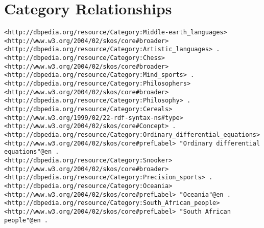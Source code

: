 \section{Category Relationships}
\begin{lstlisting}[breaklines, basicstyle=\small]
<http://dbpedia.org/resource/Category:Middle-earth_languages> <http://www.w3.org/2004/02/skos/core#broader> <http://dbpedia.org/resource/Category:Artistic_languages> .
<http://dbpedia.org/resource/Category:Chess> <http://www.w3.org/2004/02/skos/core#broader> <http://dbpedia.org/resource/Category:Mind_sports> .
<http://dbpedia.org/resource/Category:Philosophers> <http://www.w3.org/2004/02/skos/core#broader> <http://dbpedia.org/resource/Category:Philosophy> .
<http://dbpedia.org/resource/Category:Cereals> <http://www.w3.org/1999/02/22-rdf-syntax-ns#type> <http://www.w3.org/2004/02/skos/core#Concept> .
<http://dbpedia.org/resource/Category:Ordinary_differential_equations> <http://www.w3.org/2004/02/skos/core#prefLabel> "Ordinary differential equations"@en .
<http://dbpedia.org/resource/Category:Snooker> <http://www.w3.org/2004/02/skos/core#broader> <http://dbpedia.org/resource/Category:Precision_sports> .
<http://dbpedia.org/resource/Category:Oceania> <http://www.w3.org/2004/02/skos/core#prefLabel> "Oceania"@en .
<http://dbpedia.org/resource/Category:South_African_people> <http://www.w3.org/2004/02/skos/core#prefLabel> "South African people"@en .
\end{lstlisting}